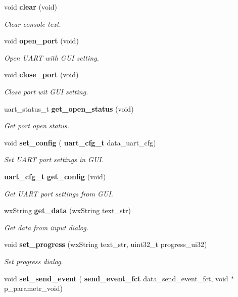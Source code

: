 \begin{DoxyCompactItemize}
void \textbf{ clear} (void)
\begin{DoxyCompactList}\small\item\em Clear console text. \end{DoxyCompactList}\item 
void \textbf{ open\+\_\+port} (void)
\begin{DoxyCompactList}\small\item\em Open U\+A\+RT with G\+UI setting. \end{DoxyCompactList}\item 
void \textbf{ close\+\_\+port} (void)
\begin{DoxyCompactList}\small\item\em Close port wit G\+UI setting. \end{DoxyCompactList}\item 
uart\+\_\+status\+\_\+t \textbf{ get\+\_\+open\+\_\+status} (void)
\begin{DoxyCompactList}\small\item\em Get port open status. \end{DoxyCompactList}\item 
void \textbf{ set\+\_\+config} (\textbf{ uart\+\_\+cfg\+\_\+t} data\+\_\+uart\+\_\+cfg)
\begin{DoxyCompactList}\small\item\em Set U\+A\+RT port settings in G\+UI. \end{DoxyCompactList}\item 
\textbf{ uart\+\_\+cfg\+\_\+t} \textbf{ get\+\_\+config} (void)
\begin{DoxyCompactList}\small\item\em Get U\+A\+RT port settings from G\+UI. \end{DoxyCompactList}\item 
wx\+String \textbf{ get\+\_\+data} (wx\+String text\+\_\+str)
\begin{DoxyCompactList}\small\item\em Get data from input dialog. \end{DoxyCompactList}\item 
void \textbf{ set\+\_\+progress} (wx\+String text\+\_\+str, uint32\+\_\+t progress\+\_\+ui32)
\begin{DoxyCompactList}\small\item\em Set progress dialog. \end{DoxyCompactList}\item 
void \textbf{ set\+\_\+send\+\_\+event} (\textbf{ send\+\_\+event\+\_\+fct} data\+\_\+send\+\_\+event\+\_\+fct, void $\ast$p\+\_\+parametr\+\_\+void)

\end{DoxyCompactItemize}
